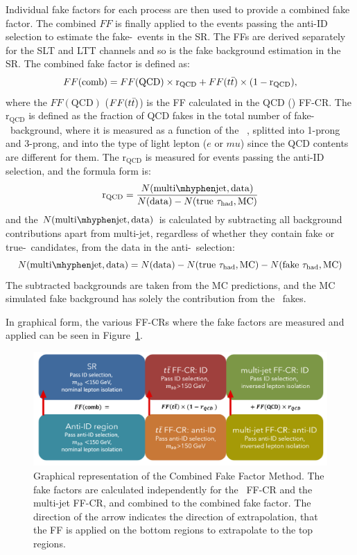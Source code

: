 Individual fake factors for each process
are then used to provide a combined fake factor. 
The combined $FF$ is finally applied to the events passing the 
anti-ID selection
to estimate the fake-\tauhad\ events in the SR.
The FFs are derived separately for the SLT and LTT channels and
so is the fake background estimation in the SR.
The combined fake factor is defined as:
\begin{equation}
FF(\mathrm{comb}) = FF(\mathrm{QCD}) \times \mathrm{r}_{\mathrm{QCD}} + FF(t\bar{t}) \times (1 - \mathrm{r}_{\mathrm{QCD}}),
\end{equation} 
where the $FF(\mathrm{QCD})$ ($FF(t\bar{t})$) is the FF calculated in the QCD (\ttbar) FF-CR.
The $\mathrm{r}_{\mathrm{QCD}}$ is
defined as the fraction of QCD fakes
in the total number of fake-\tauhad\ background, 
where it is measured as a function of the \tauhad\ \pT, splitted 
into 1-prong and 3-prong, and into the type of light lepton ($e$ or $mu$)
since the QCD contents are different for them. 
The $\mathrm{r}_{\mathrm{QCD}}$ is measured for events passing the 
anti-ID selection, and the formula form is:
\begin{equation}
\mathrm{r}_{\mathrm{QCD}} = \frac{N(\mathrm{multi\mhyphen jet, data})} {N(\mathrm{data}) - N(\mathrm{true}~\tauhad, \mathrm{MC})}
\end{equation} 
and the $N(\mathrm{multi\mhyphen jet, data})$ is calculated by 
subtracting all background contributions apart from multi-jet, 
regardless of whether they contain fake or true-\tauhad\ candidates, 
from the data in the anti-\tauhad\ selection:
\begin{equation}
	N(\mathrm{multi\mhyphen jet, data}) = N(\mathrm{data}) - N(\mathrm{true}~\tauhad, \mathrm{MC}) - N(\mathrm{fake}~\tauhad, \mathrm{MC})
\end{equation}  
The subtracted backgrounds are taken from the MC predictions,
and the MC simulated fake background has solely the contribution from the
\ttbar\ fakes. 


In graphical form, the various FF-CRs 
where the fake factors are measured and applied can be seen in Figure~\ref{fig:CombFFMethod}.
\begin{figure}[htbp]
\centering
\includegraphics[width=.9\textwidth]{DiHiggs/plots/FF regions.png}
\caption{Graphical representation of the Combined Fake Factor Method. 
The fake factors are calculated independently for the \ttbar\ FF-CR and the multi-jet FF-CR, and 
combined to the combined fake factor. 
The direction of the arrow indicates the direction 
of extrapolation, 
that the FF is applied on the bottom regions to extrapolate to the top regions.}
\label{fig:CombFFMethod}
\end{figure}



